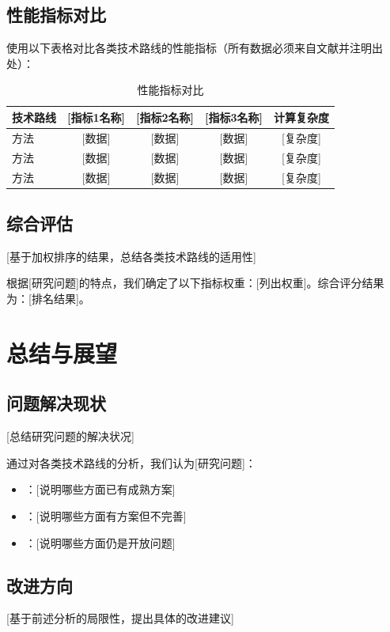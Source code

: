 \documentclass[journal]{IEEEtran}
\begin{document}
\subsection{性能指标对比}
使用以下表格对比各类技术路线的性能指标（所有数据必须来自文献并注明出处）：

\begin{table}[htbp]
\centering
\caption{性能指标对比}
\begin{tabular}{lcccc}
\toprule
技术路线 & [指标1名称] & [指标2名称] & [指标3名称] & 计算复杂度 \\
\midrule
[类别1]方法 \cite{ref1} & [数据] & [数据] & [数据] & [复杂度] \\
[类别2]方法 \cite{ref3} & [数据] & [数据] & [数据] & [复杂度] \\
[类别3]方法 \cite{ref4} & [数据] & [数据] & [数据] & [复杂度] \\
\bottomrule
\end{tabular}
\label{tab:performance}
\end{table}

\subsection{综合评估}
[基于加权排序的结果，总结各类技术路线的适用性]

根据[研究问题]的特点，我们确定了以下指标权重：[列出权重]。综合评分结果为：[排名结果]。

\section{总结与展望}

\subsection{问题解决现状}
[总结研究问题的解决状况]

通过对各类技术路线的分析，我们认为[研究问题]：
\begin{itemize}
    \item [已解决的部分]：[说明哪些方面已有成熟方案]
    \item [部分解决的部分]：[说明哪些方面有方案但不完善]
    \item [未解决的部分]：[说明哪些方面仍是开放问题]
\end{itemize}

\subsection{改进方向}
[基于前述分析的局限性，提出具体的改进建议]
\end{document}
